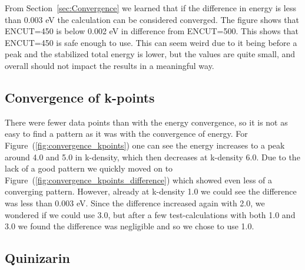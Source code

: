\documentclass{article}
\begin{document}
    From Section~\ref{sec:Convergence} we learned that if the difference in energy is less than 0.003 eV the calculation can be considered converged. The figure shows that ENCUT=450 is below 0.002 eV in difference from ENCUT=500. This shows that ENCUT=450 is safe enough to use. This can seem weird due to it being before a peak and the stabilized total energy is lower, but the values are quite small, and overall should not impact the results in a meaningful way. \\

  \subsection{Convergence of k-points}

    There were fewer data points than with the energy convergence, so it is not as easy to find a pattern as it was with the convergence of energy. For Figure~(\ref{fig:convergence_kpoints}) one can see the energy increases to a peak around 4.0 and 5.0 in k-density, which then decreases at k-density 6.0. Due to the lack of a good pattern we quickly moved on to Figure~(\ref{fig:convergence_kpoints_difference}) which showed even less of a converging pattern. However, already at k-density 1.0 we could see the difference was less than 0.003 eV. Since the difference increased again with 2.0, we wondered if we could use 3.0, but after a few test-calculations with both 1.0 and 3.0 we found the difference was negligible and so we chose to use 1.0. \\

  \subsection{Quinizarin}
\end{document}
